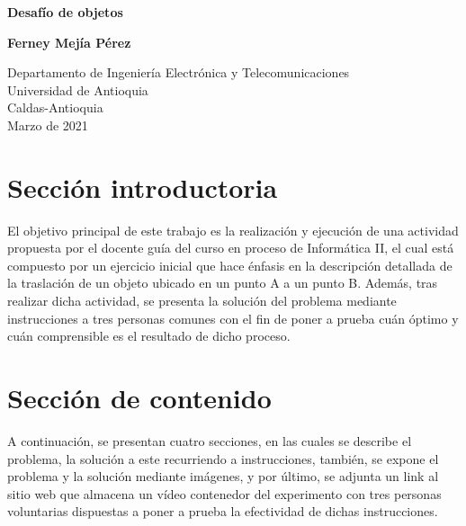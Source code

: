 \documentclass{article}
\begin{document}
\begin{titlepage}
    \begin{center}
        \vspace*{1cm}
            
        \Huge
        \textbf{Desafío de objetos}
            
        \vspace{0.5cm}
        \LARGE
            
            
        \vspace{1.5cm}
            
        \textbf{Ferney Mejía Pérez}
            
        \vfill
            
        \vspace{0.8cm}
            
        \Large
        Departamento de Ingeniería Electrónica y Telecomunicaciones\\
        Universidad de Antioquia\\
        Caldas-Antioquia\\
        Marzo de 2021
            
    \end{center}
\end{titlepage}

\tableofcontents
\newpage
\section{Sección introductoria}\label{intro}
El objetivo principal de este trabajo es la realización y ejecución de una actividad propuesta por el docente guía del curso en proceso de Informática II, el cual está compuesto por un ejercicio inicial que hace énfasis en la descripción detallada de la traslación de un objeto ubicado en un punto A a un punto B. Además, tras realizar dicha actividad, se presenta la solución del problema mediante instrucciones a tres personas comunes con el fin de poner a prueba cuán óptimo y cuán comprensible es el resultado de dicho proceso.


\section{Sección de contenido} \label{contenido}
A continuación, se presentan cuatro secciones, en las cuales se describe el problema, la solución a este recurriendo a instrucciones, también, se expone el problema y la solución mediante imágenes, y por último, se adjunta un link al sitio web que almacena un vídeo contenedor del experimento con tres personas voluntarias dispuestas a poner a prueba la efectividad de dichas instrucciones.
\end{document}
